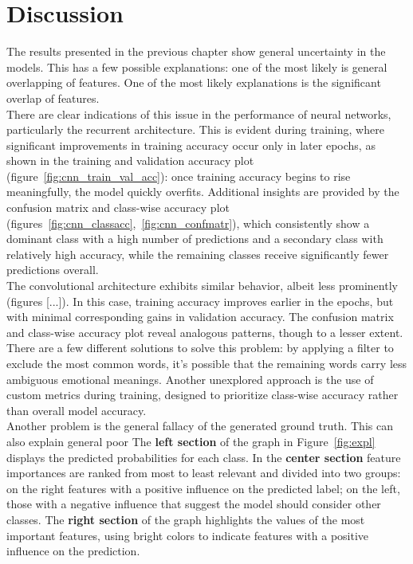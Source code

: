 \chapter*{Discussion}
\label{ch:discussion}
The results presented in the previous chapter show general
uncertainty in the models. This has a few possible explanations:
one of the most likely is general overlapping of features. One of the most likely
explanations is the significant overlap of features.\\

There are clear indications of this issue in the performance of neural networks,
particularly the recurrent architecture. This is evident during training, where
significant improvements in training accuracy occur only in later epochs, as shown
in the training and validation accuracy plot (figure~\ref{fig:cnn_train_val_acc}):
once training accuracy begins to rise meaningfully, the model quickly overfits.
Additional insights are provided by the confusion matrix and class-wise accuracy
plot (figures~\ref{fig:cnn_classacc},~\ref{fig:cnn_confmatr}), which consistently
show a dominant class with a high number of predictions and a secondary class
with relatively high accuracy, while the remaining classes receive significantly
fewer predictions overall.\\

The convolutional architecture exhibits similar behavior, albeit less prominently
(figures [...]). In this case, training accuracy improves earlier in the epochs,
but with minimal corresponding gains in validation accuracy.
The confusion matrix and class-wise accuracy plot reveal analogous patterns, though
to a lesser extent.\\

There are a few different solutions to solve this problem: by applying a filter to
exclude the most common words, it's possible that the remaining words carry less ambiguous emotional meanings.
Another unexplored approach is the use of custom metrics during training, designed
to prioritize class-wise accuracy rather than overall model accuracy.\\

Another problem is the general fallacy of the generated ground truth. This can
also explain general poor
The \textbf{left section} of the graph in Figure~\ref{fig:expl} displays the predicted probabilities for each class. In the \textbf{center section}
feature importances are ranked from most to least relevant and divided into two groups: on the right
features with a positive influence on the predicted label; on the left, those with a negative influence that suggest the model should consider other classes.
The \textbf{right section} of the graph highlights the values of the most important
features, using bright colors to indicate features with a positive influence on the prediction.

